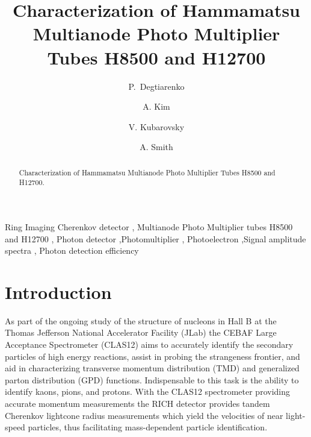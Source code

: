 \documentclass[5p,times,preprint]{elsarticle}
\begin{document}
\begin{frontmatter}
\title{Characterization of Hammamatsu Multianode Photo Multiplier Tubes H8500 and H12700}

\author[A]{P.~Degtiarenko }
\author[B]{A. Kim } 
\author[A]{V. Kubarovsky }

\author[C]{A. Smith}

\address[A]{Jefferson Lab, Newport News, Virginia, USA}
\address[B]{University of Connecticut, Storrs, CT 0626, USA}
\address[C]{Duke University, Durham, NC 2770, USA}

\begin{abstract}
Characterization of Hammamatsu Multianode Photo Multiplier Tubes H8500 and H12700.

\end{abstract}

\begin{keyword}
Ring Imaging Cherenkov detector \sep
Multianode Photo Multiplier tubes H8500 and H12700 \sep
Photon detector \sep Photomultiplier  \sep
Photoelectron  \sep  Signal amplitude spectra \sep 
Photon detection efficiency
\end{keyword}


\end{frontmatter}

\section{Introduction}

As part of the ongoing study of the structure of nucleons \cite{Avakian:2010ae}  in Hall B at the Thomas Jefferson National Accelerator Facility (JLab)  the CEBAF Large Acceptance Spectrometer (CLAS12) \cite{Burkert:2020akg} aims to accurately identify the secondary particles of high energy reactions, assist in probing the strangeness frontier, and aid in characterizing transverse momentum distribution (TMD) and generalized parton distribution (GPD) functions. Indispensable to this task is the ability to identify kaons, pions, and protons.  With the CLAS12 spectrometer providing accurate momentum measurements the RICH detector \cite{Contalbrigo:2020,Contalbrigo:2020snw,Mirazita:2017vav,Contalbrigo:2014rqa} provides tandem Cherenkov lightcone radius measurements which yield the velocities of near light-speed particles, thus facilitating mass-dependent particle identification.
\end{document}
